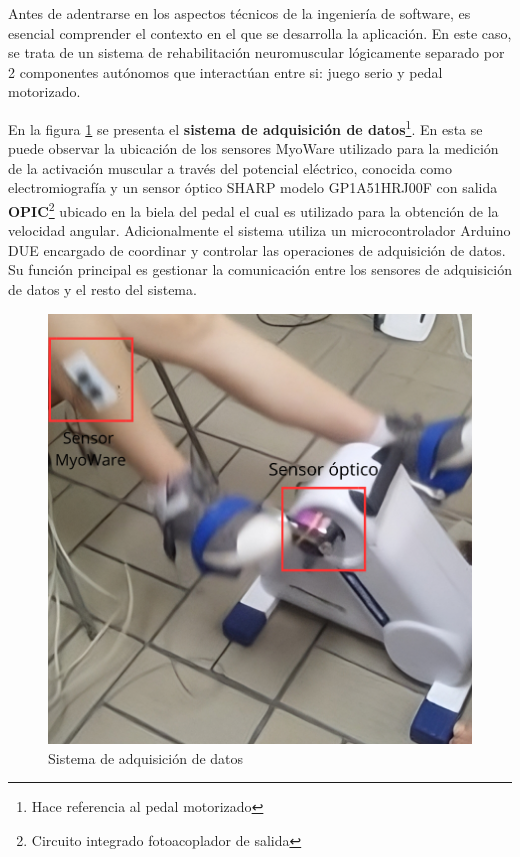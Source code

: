 Antes de adentrarse en los aspectos técnicos de la ingeniería de software, es esencial comprender el contexto en el que se desarrolla la aplicación. En este caso, se trata de un sistema de rehabilitación neuromuscular lógicamente separado por 2 componentes autónomos que interactúan entre si: juego serio y pedal motorizado. 

En la figura \ref{fig: sa} se presenta el \textbf{sistema de adquisición de datos}\footnote{Hace referencia al pedal motorizado}. En esta se puede observar la ubicación de los sensores MyoWare utilizado para la medición de la activación muscular a través del potencial eléctrico, conocida como electromiografía y un sensor óptico SHARP modelo GP1A51HRJ00F con salida \textbf{OPIC}\footnote{Circuito integrado fotoacoplador de salida} ubicado en la biela del pedal el cual es utilizado para la obtención de la velocidad angular. Adicionalmente el sistema utiliza un microcontrolador Arduino DUE encargado de coordinar y controlar las operaciones de adquisición de datos. Su función principal es gestionar la comunicación entre los sensores de adquisición de datos y el resto del sistema.

\begin{figure}[ht]
    \centering
    \includegraphics[scale=0.2]{images/sa.png}
    \caption{Sistema de adquisición de datos}
    \label{fig: sa}
\end{figure}    

